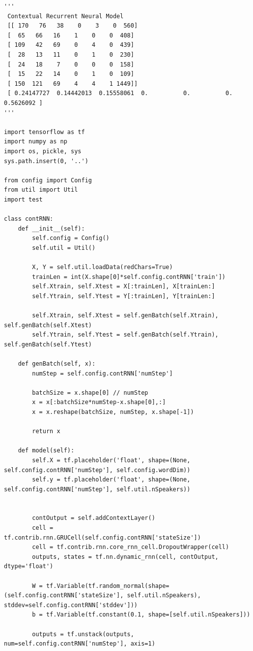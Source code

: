 \documentclass[BTech]{srmuthesis}
\begin{document}
\begin{verbatim}
'''
 Contextual Recurrent Neural Model
 [[ 170   76   38    0    3    0  560]
 [  65   66   16    1    0    0  408]
 [ 109   42   69    0    4    0  439]
 [  28   13   11    0    1    0  230]
 [  24   18    7    0    0    0  158]
 [  15   22   14    0    1    0  109]
 [ 150  121   69    4    4    1 1449]]
 [ 0.24147727  0.14442013  0.15558061  0.          0.          0.          0.5626092 ]
'''

import tensorflow as tf
import numpy as np
import os, pickle, sys
sys.path.insert(0, '..')

from config import Config
from util import Util
import test

class contRNN:
    def __init__(self):
        self.config = Config()
        self.util = Util()

        X, Y = self.util.loadData(redChars=True)
        trainLen = int(X.shape[0]*self.config.contRNN['train'])
        self.Xtrain, self.Xtest = X[:trainLen], X[trainLen:]
        self.Ytrain, self.Ytest = Y[:trainLen], Y[trainLen:]

        self.Xtrain, self.Xtest = self.genBatch(self.Xtrain), self.genBatch(self.Xtest)
        self.Ytrain, self.Ytest = self.genBatch(self.Ytrain), self.genBatch(self.Ytest)

    def genBatch(self, x):
        numStep = self.config.contRNN['numStep']

        batchSize = x.shape[0] // numStep
        x = x[:batchSize*numStep-x.shape[0],:]
        x = x.reshape(batchSize, numStep, x.shape[-1])

        return x

    def model(self):
        self.X = tf.placeholder('float', shape=(None, self.config.contRNN['numStep'], self.config.wordDim))
        self.y = tf.placeholder('float', shape=(None, self.config.contRNN['numStep'], self.util.nSpeakers))


        contOutput = self.addContextLayer()
        cell = tf.contrib.rnn.GRUCell(self.config.contRNN['stateSize'])
        cell = tf.contrib.rnn.core_rnn_cell.DropoutWrapper(cell)
        outputs, states = tf.nn.dynamic_rnn(cell, contOutput,  dtype='float')

        W = tf.Variable(tf.random_normal(shape=(self.config.contRNN['stateSize'], self.util.nSpeakers), stddev=self.config.contRNN['stddev']))
        b = tf.Variable(tf.constant(0.1, shape=[self.util.nSpeakers]))

        outputs = tf.unstack(outputs, num=self.config.contRNN['numStep'], axis=1)


\end{verbatim}
\end{document}
